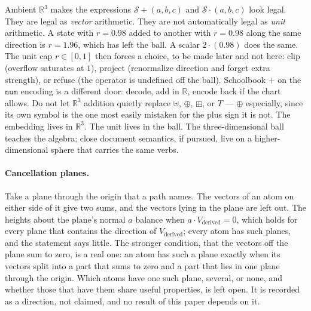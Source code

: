 \documentclass[12pt, a4paper]{article}
\begin{document}
Ambient $\mathbb{R}^3$ makes the expressions
$\mathcal{S}+(a,b,c)$ and $\mathcal{S}\cdot(a,b,c)$ look legal.
They are legal as \emph{vector} arithmetic. They are not automatically
legal as \emph{unit} arithmetic. A state with $r=0.98$ added to
another with $r=0.98$ along the same direction is $r=1.96$, which
has left the ball. A scalar $2\cdot(0.98)$ does the same. The unit
cap $r\in[0,1]$ then forces a choice, to be made later and not
here: clip (overflow saturates at $1$), project (renormalize
direction and forget extra strength), or refuse (the operator is
undefined off the ball). Schoolbook $+$ on the $\mathtt{num}$
encoding is a different door: decode, add in $\mathbb{R}$, encode
back if the chart allows. Do not let $\mathbb{R}^3$ addition
quietly replace $\uplus$, $\oplus$, $\boxplus$, or $T$ --- $\oplus$
especially, since its own symbol is the one most easily mistaken for
the plus sign it is not. The embedding
lives in $\mathbb{R}^3$. The unit lives in the ball.
The three-dimensional ball teaches the algebra; close document
semantics, if pursued, live on a higher-dimensional sphere that
carries the same verbs.

\paragraph{Cancellation planes.}
Take a plane through the origin that a path names. The vectors of an atom on either side of it give two sums, and the vectors lying in the plane are left out. The heights about the plane's normal $a$ balance when $a\cdot V_{\text{derived}}=0$, which holds for every plane that contains the direction of $V_{\text{derived}}$; every atom has such planes, and the statement says little. The stronger condition, that the vectors off the plane sum to zero, is a real one: an atom has such a plane exactly when its vectors split into a part that sums to zero and a part that lies in one plane through the origin. Which atoms have one such plane, several, or none, and whether those that have them share useful properties, is left open. It is recorded as a direction, not claimed, and no result of this paper depends on it.
\end{document}
